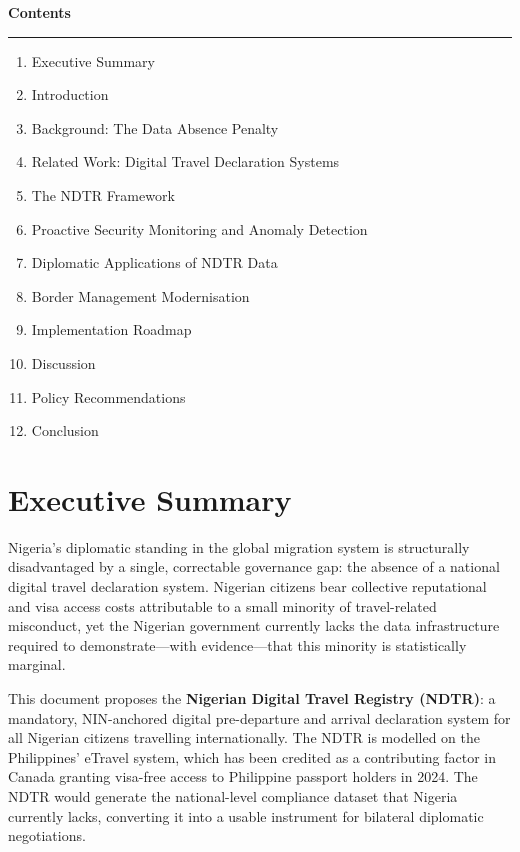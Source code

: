 \documentclass[11pt]{article}
\begin{document}
\vspace{14pt}

{\color{primary-blue}\bfseries\large Contents}\\[-4pt]
{\color{light-grey}\rule{\textwidth}{2pt}}
\vspace{4pt}
\begin{enumerate}[label=\textbf{\arabic*.}, leftmargin=*, itemsep=2pt]
    \item Executive Summary
    \item Introduction
    \item Background: The Data Absence Penalty
    \item Related Work: Digital Travel Declaration Systems
    \item The NDTR Framework
    \item Proactive Security Monitoring and Anomaly Detection
    \item Diplomatic Applications of NDTR Data
    \item Border Management Modernisation
    \item Implementation Roadmap
    \item Discussion
    \item Policy Recommendations
    \item Conclusion
\end{enumerate}
\vspace{10pt}

\section*{Executive Summary}

Nigeria's diplomatic standing in the global migration system is structurally disadvantaged by
a single, correctable governance gap: the absence of a national digital travel declaration
system. Nigerian citizens bear collective reputational and visa access costs attributable to
a small minority of travel-related misconduct, yet the Nigerian government currently lacks
the data infrastructure required to demonstrate---with evidence---that this minority is
statistically marginal.

This document proposes the \textbf{Nigerian Digital Travel Registry (NDTR)}: a mandatory,
NIN-anchored digital pre-departure and arrival declaration system for all Nigerian citizens
travelling internationally. The NDTR is modelled on the Philippines' eTravel system, which
has been credited as a contributing factor in Canada granting visa-free access to Philippine
passport holders in 2024. The NDTR would generate the national-level compliance dataset
that Nigeria currently lacks, converting it into a usable instrument for bilateral
diplomatic negotiations.
\end{document}
